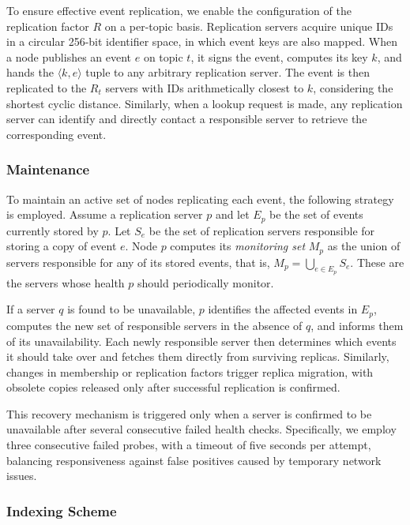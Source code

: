 To ensure effective event replication, we enable the configuration of the replication factor $R$ on a per-topic basis.
Replication servers acquire unique IDs in a circular 256-bit identifier space, in which event keys are also mapped.
When a node publishes an event $e$ on topic $t$, it signs the event, computes its key $k$, and hands the $\langle k,e \rangle$ tuple to any arbitrary replication server.
The event is then replicated to the $R_t$ servers with IDs arithmetically closest to $k$, considering the shortest cyclic distance.
Similarly, when a lookup request is made, any replication server can identify and directly contact a responsible server to retrieve the corresponding event.

\subsubsection{Maintenance}

To maintain an active set of nodes replicating each event, the following strategy is employed. 
Assume a replication server $p$ and let $E_p$ be the set of events currently stored by $p$. 
Let $S_e$ be the set of replication servers responsible for storing a copy of event $e$. 
Node $p$ computes its \emph{monitoring set} $M_p$ as the union of servers responsible for any of its stored events, that is, $M_p = \bigcup_{e \in E_p} S_e$. 
These are the servers whose health $p$ should periodically monitor.

If a server $q$ is found to be unavailable, $p$ identifies the affected events in $E_p$, computes the new set of responsible servers in the absence of $q$, and informs them of its unavailability. 
Each newly responsible server then determines which events it should take over and fetches them directly from surviving replicas. 
Similarly, changes in membership or replication factors trigger replica migration, with obsolete copies released only after successful replication is confirmed.

This recovery mechanism is triggered only when a server is confirmed to be unavailable after several consecutive failed health checks. 
Specifically, we employ three consecutive failed probes, with a timeout of five seconds per attempt, balancing responsiveness against false positives caused by temporary network issues.

\subsubsection{Indexing Scheme}
\label{sec:indexing-scheme}

